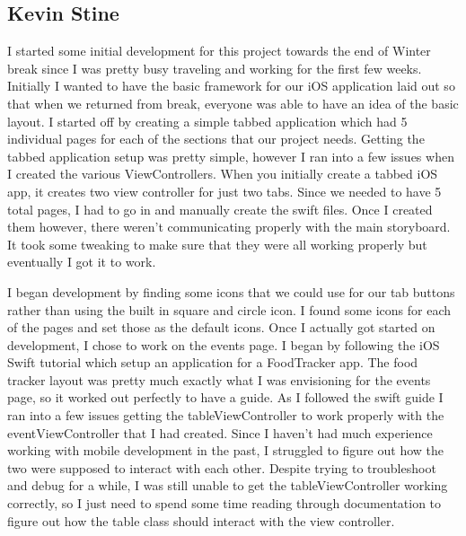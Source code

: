 \documentclass[letterpaper,10pt,draftclsnofoot,onecolumn,titlepage]{IEEEtran}
\begin{document}
	\subsection{Kevin Stine}
	I started some initial development for this project towards the end of Winter break since I was pretty busy traveling and working for the first few weeks.
	Initially I wanted to have the basic framework for our iOS application laid out so that when we returned from break, everyone was able to have an idea of the basic layout.
	I started off by creating a simple tabbed application which had 5 individual pages for each of the sections that our project needs.
	Getting the tabbed application setup was pretty simple, however I ran into a few issues when I created the various ViewControllers.
	When you initially create a tabbed iOS app, it creates two view controller for just two tabs. Since we needed to have 5 total pages, I had to go in and manually create the swift files.
	Once I created them however, there weren't communicating properly with the main storyboard. It took some tweaking to make sure that they were all working properly but eventually I got it to work.

	I began development by finding some icons that we could use for our tab buttons rather than using the built in square and circle icon.
	I found some icons for each of the pages and set those as the default icons.
	Once I actually got started on development, I chose to work on the events page.
	I began by following the iOS Swift tutorial which setup an application for a FoodTracker app. The food tracker layout was pretty much exactly what I was envisioning for the events page, so it worked out perfectly to have a guide.
	As I followed the swift guide I ran into a few issues getting the tableViewController to work properly with the eventViewController that I had created.
	Since I haven't had much experience working with mobile development in the past, I struggled to figure out how the two were supposed to interact with each other.
	Despite trying to troubleshoot and debug for a while, I was still unable to get the tableViewController working correctly, so I just need to spend some time reading through documentation to figure out how the table class should interact with the view controller.
\end{document}
